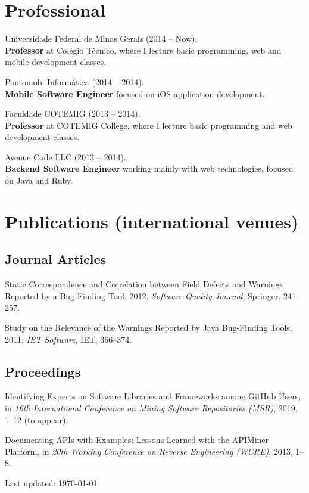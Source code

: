 \documentclass[letterpaper]{article}
\def\footerlink{}
\renewenvironment{itemize}{
  \begin{list}{}{
    \setlength{\leftmargin}{1.5em}
  }
}{
  \end{list}
}
\begin{document}
\section*{Professional}
\begin{itemize}
\item Universidade Federal de Minas Gerais (2014 -- Now). \\
\textbf{Professor} at Colégio Técnico, where I lecture basic programming, web and mobile development classes. 
\item Pontomobi Informática (2014 -- 2014). \\
\textbf{Mobile Software Engineer} focused on iOS application development.
\item Faculdade COTEMIG (2013 -- 2014). \\
\textbf{Professor} at COTEMIG College, where I lecture basic programming and web development classes.
\item Avenue Code LLC (2013 -- 2014). \\
\textbf{Backend Software Engineer} working mainly with web technologies, focused on Java and Ruby. 
\end{itemize}


\section*{Publications {\footnotesize (international venues)}}

\subsection*{Journal Articles}
\begin{itemize}
\item Static Correspondence and Correlation between Field Defects and Warnings Reported by a Bug Finding Tool, 2012, {\it Software Quality Journal}, Springer, 241--257.
\item Study on the Relevance of the Warnings Reported by Java Bug-Finding Tools, 2011, {\it IET Software}, IET, 366--374.
\end{itemize}

\subsection*{Proceedings}

\begin{itemize}
\item Identifying Experts on Software Libraries and Frameworks among GitHub Users, in \textit{16th International Conference on Mining Software Repositories (MSR)}, 2019, 1--12 (to appear).
\item Documenting APIs with Examples: Lessons Learned with the APIMiner Platform, in \textit{20th Working Conference on Reverse Engineering (WCRE)}, 2013, 1--8.
\end{itemize}

\bigskip

\begin{center}
  \begin{footnotesize}
    Last updated: \today
    \href{\footerlink}{\texttt{\footerlink}}
  \end{footnotesize}
\end{center}
\end{document}
